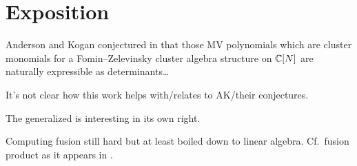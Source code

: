 \documentclass[draft]{article}
\begin{document}



\section{Exposition}

Anderson and Kogan conjectured in \cite{anderson2006algebra}  that those MV polynomials which are cluster monomials for a Fomin--Zelevinsky cluster algebra structure on $\mathbb C[N]$ are naturally expressible as determinants\dots

It's not clear how this work helps with/relates to AK/their conjectures.

The generalized \mvy is interesting in its own right. 

Computing fusion still hard but at least boiled down to linear algebra. Cf.\ fusion product as it appears in \cite{beilinson1991quantization,feigin2generalized,mirkovic2007geometric,anderson2006algebra,bezrukavnikov2005equivariant}.
\end{document}
